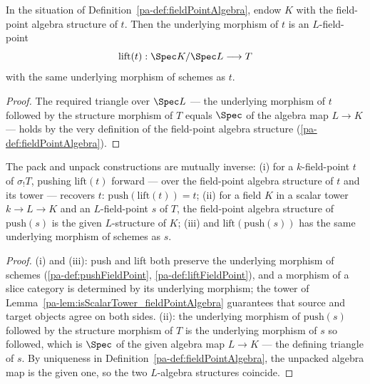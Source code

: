 \begin{definition}
  \label{pa-def:liftFieldPoint}
  \leanok

  In the situation of Definition~\ref{pa-def:fieldPointAlgebra}, endow \(K\) with the
  field-point algebra structure of \(t\). Then the underlying morphism of \(t\) is an
  \(L\)-field-point
  \[
    \mathrm{lift}(t) : \Spec K/\Spec L \longrightarrow T
  \]
  with the same underlying morphism of schemes as \(t\).
\end{definition}
\begin{proof}
  \leanok
  The required triangle over \(\Spec L\) --- the underlying morphism of \(t\) followed
  by the structure morphism of \(T\) equals \(\Spec\) of the algebra map \(L \to K\)
  --- holds by the very definition of the field-point algebra structure
  (\ref{pa-def:fieldPointAlgebra}).
\end{proof}

\begin{theorem}
  \label{pa-thm:fieldPoint_roundTrip}
  \leanok

  The pack and unpack constructions are mutually inverse:
  (i) for a \(k\)-field-point \(t\) of \(\sigma_{!}T\), pushing \(\mathrm{lift}(t)\)
  forward --- over the field-point algebra structure of \(t\) and its tower ---
  recovers \(t\): \(\mathrm{push}(\mathrm{lift}(t)) = t\);
  (ii) for a field \(K\) in a scalar tower \(k \to L \to K\) and an \(L\)-field-point
  \(s\) of \(T\), the field-point algebra structure of \(\mathrm{push}(s)\) is the
  given \(L\)-structure of \(K\);
  (iii) and \(\mathrm{lift}(\mathrm{push}(s))\) has the same underlying morphism of
  schemes as \(s\).
\end{theorem}
\begin{proof}
  \leanok
  (i) and (iii): push and lift both preserve the underlying morphism of schemes
  (\ref{pa-def:pushFieldPoint}, \ref{pa-def:liftFieldPoint}), and a morphism of a slice
  category is determined by its underlying morphism; the tower of
  Lemma~\ref{pa-lem:isScalarTower_fieldPointAlgebra} guarantees that source and target
  objects agree on both sides. (ii): the underlying morphism of \(\mathrm{push}(s)\)
  followed by the structure morphism of \(T\) is the underlying morphism of \(s\) so
  followed, which is \(\Spec\) of the given algebra map \(L \to K\) --- the defining
  triangle of \(s\). By uniqueness in Definition~\ref{pa-def:fieldPointAlgebra}, the
  unpacked algebra map is the given one, so the two \(L\)-algebra structures coincide.
\end{proof}

